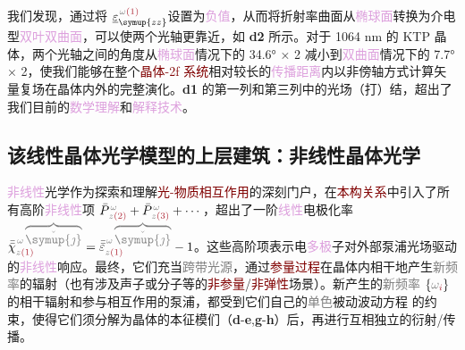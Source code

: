 我们发现，通过将 $\underline{\varepsilon}^{\;\! \mathcolor{gray}{\omega} \textcolor{Maroon}{(1)}}_{\symup{zz}}$设置为\textcolor{Plum}{负值}，从而将\textcolor{PineGreen}{折射率曲面}从\textcolor{Plum}{椭球面}转换为\textcolor{NavyBlue}{介电型}\textcolor{Plum}{双叶双曲面}，可以使两个\textcolor{PineGreen}{光轴}更靠近，如 \textbf{d2} 所示。对于 1064 nm 的 KTP 晶体，两个\textcolor{PineGreen}{光轴}之间的角度从\textcolor{Plum}{椭球面}情况下的 34.6° × 2 减小到\textcolor{Plum}{双曲面}情况下的 7.7° × 2，使我们能够在整个\textcolor{Maroon}{晶体-2f 系统}相对较长的\textcolor{Plum}{传播距离}内以\textcolor{PineGreen}{非傍轴}方式计算\textcolor{PineGreen}{矢量复场}在晶体内外的完整演化。\textbf{d1} 的第一列和第三列中的光场（打）结，超出了我们目前的\textcolor{Plum}{数学理解}和\textcolor{Plum}{解释技术}。

\vspace*{-4.5em}

\subsection{该线性晶体光学模型的上层建筑：非线性晶体光学}\label{ssec:LFCO-Superstructure}

\textcolor{Plum}{非线性}\textcolor{NavyBlue}{光学}作为探索和理解\textcolor{Maroon}{光-物质相互作用}的深刻门户，在\textcolor{Maroon}{本构关系}中引入了所有高阶\textcolor{Plum}{非线性}项 $\bar{P}^{\;\! \mathcolor{gray}{\omega}}_{\;\! \mathcolor{gray}{z} \textcolor{Maroon}{(2)}} + \bar{P}^{\;\! \mathcolor{gray}{\omega}}_{\;\! \mathcolor{gray}{z} \textcolor{Maroon}{(3)}} + \cdots$，超出了一阶\textcolor{Plum}{线性}电极化率 $\bar{\bar{\chi}}^{\;\! \mathcolor{gray}{\omega} \mathcolor{gray}{\overbrace{\check{\symup{\jmath}}}}}_{\mathcolor{gray}{z} \textcolor{Maroon}{(1)}} = \bar{\bar{\varepsilon}}^{\;\! \mathcolor{gray}{\omega} \mathcolor{gray}{\overbrace{\check{\symup{\jmath}}}}}_{\mathcolor{gray}{z} \textcolor{Maroon}{(1)}} - 1$。这些高阶项表示电\textcolor{Plum}{多极}子对外部\textcolor{NavyBlue}{泵浦光场}驱动的\textcolor{Plum}{非线性}响应。最终，它们充当\textcolor{gray}{跨带}\textcolor{gray}{光源}，通过\textcolor{Maroon}{参量过程}在晶体内\textcolor{PineGreen}{相干}地产生\textcolor{gray}{新频率}的辐射（也有涉及声子或分子等的\textcolor{Maroon}{非参量}/\textcolor{Maroon}{非弹性}场景\cite{grundmannOpticallyAnisotropicMedia2017,boydNonlinearOptics2019}）。新产生的\textcolor{gray}{新频率} $\left\{ \mathcolor{gray}{\omega}_{\textcolor{Maroon}{i}} \right\}$ 的相干辐射和参与相互作用的\textcolor{NavyBlue}{泵浦}，都受到它们自己的\textcolor{gray}{单色}\textcolor{NavyBlue}{被动}波动方程  的约束，使得它们须分解为晶体的\textcolor{PineGreen}{本征模们}（\textbf{d}-\textbf{e},\textbf{g}-\textbf{h}）后，再进行互相独立的衍射/传播。

